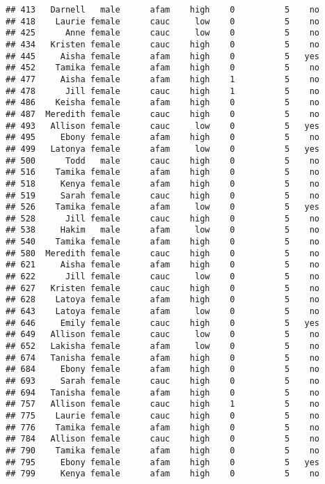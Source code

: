 \documentclass[
]{article}
\begin{document}
\begin{verbatim}
## 413   Darnell   male      afam    high    0          5    no
## 418    Laurie female      cauc     low    0          5    no
## 425      Anne female      cauc     low    0          5    no
## 434   Kristen female      cauc    high    0          5    no
## 445     Aisha female      afam    high    0          5   yes
## 452    Tamika female      afam    high    0          5    no
## 477     Aisha female      afam    high    1          5    no
## 478      Jill female      cauc    high    1          5    no
## 486    Keisha female      afam    high    0          5    no
## 487  Meredith female      cauc    high    0          5    no
## 493   Allison female      cauc     low    0          5   yes
## 495     Ebony female      afam    high    0          5    no
## 499   Latonya female      afam     low    0          5   yes
## 500      Todd   male      cauc    high    0          5    no
## 516    Tamika female      afam    high    0          5    no
## 518     Kenya female      afam    high    0          5    no
## 519     Sarah female      cauc    high    0          5    no
## 526    Tamika female      afam     low    0          5   yes
## 528      Jill female      cauc    high    0          5    no
## 538     Hakim   male      afam     low    0          5    no
## 540    Tamika female      afam    high    0          5    no
## 580  Meredith female      cauc    high    0          5    no
## 621     Aisha female      afam    high    0          5    no
## 622      Jill female      cauc     low    0          5    no
## 627   Kristen female      cauc    high    0          5    no
## 628    Latoya female      afam    high    0          5    no
## 643    Latoya female      afam     low    0          5    no
## 646     Emily female      cauc    high    0          5   yes
## 649   Allison female      cauc     low    0          5    no
## 652   Lakisha female      afam     low    0          5    no
## 674   Tanisha female      afam    high    0          5    no
## 684     Ebony female      afam    high    0          5    no
## 693     Sarah female      cauc    high    0          5    no
## 694   Tanisha female      afam    high    0          5    no
## 757   Allison female      cauc    high    1          5    no
## 775    Laurie female      cauc    high    0          5    no
## 776    Tamika female      afam    high    0          5    no
## 784   Allison female      cauc    high    0          5    no
## 790    Tamika female      afam    high    0          5    no
## 795     Ebony female      afam    high    0          5   yes
## 799     Kenya female      afam    high    0          5    no

\end{verbatim}
\end{document}
